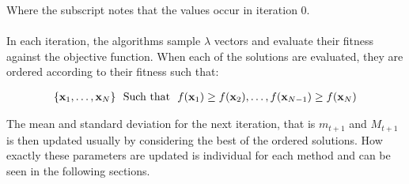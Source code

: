 Where the subscript notes that the values occur in iteration 0.\\
\\
In each iteration, the algorithms sample $\lambda$ vectors and evaluate their fitness
against the objective function. When each of the solutions are evaluated,
they are ordered according to their fitness such that:

\begin{align*}
\{\textbf{\individual }_{1}, \hdots, \textbf{\individual }_{\populationSize }\}\ \ \text{Such that}\ \ 
f(\textbf{x}_1) \geq f(\textbf{\individual }_2), \hdots, f(\textbf{\individual }_{\populationSize  - 1}) \geq f(\textbf{\individual }_{\populationSize })
\end{align*}

The mean and standard deviation for the next iteration, that is $m_{t+1}$ and $M_{t+1}$
is then updated usually by considering the best of the ordered solutions. How exactly
these parameters are updated is individual for each method and can be seen in the following
sections.




